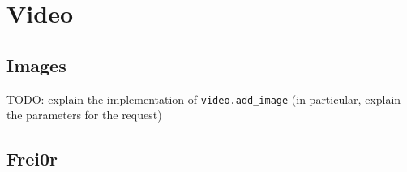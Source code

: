 \chapter{Video}
\section{Images}
TODO: explain the implementation of \verb|video.add_image| (in particular,
explain the parameters for the request)

\section{Frei0r}
